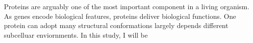 Proteins are arguably one of the most important component in a living organism. As genes encode biological features, proteins deliver biological functions. One protein can adopt many structural conformations largely depends different subcelluar enviornments.    In this study, I will be 